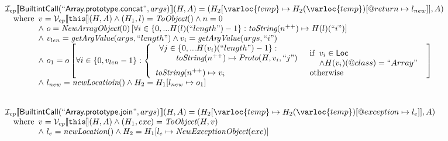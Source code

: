 \[\begin{array}{l}
\I _{cp}\lbr \SF{BuiltintCall}(``\SF{Array.prototype.concat}",args)\rbr(H,A)
 = (H_2[\varloc{temp}\mapsto H_2(\varloc{temp})[\varprop{return}\mapsto l_{new}]], A) \\
\quad\wherec{
  v = \V _{cp}\lbr \TT{this}\rbr (H,A) \land (H_1,l) = \hf{ToObject}()
  \land n = 0\\
  \land\ o = \hf{NewArrayObject}(0)\left[
        \forall i \in \{0,... H(l)(``length") -1\}:\hf{toString}(n^{++}) \mapsto H(l)(``i")\right]\\
  \land\ v_{len} = \hf{getArgValue}(args, ``length") \land v_i = \hf{getArgValue}(args, ``i")\\
  \land\ o_1 = o\left[\forall i \in \{0, v_{len} - 1\}:
    \left\{\begin{array}{ll}
      \begin{array}{l}
        \forall j \in \{0,... H(v_i)(``length") -1\}:\\
        \quad\quad\hf{toString}(n^{++}) \mapsto \hf{Proto}(H,v_i,``j")
      \end{array}
      & \ifc{v_i \in \SF{Loc}\\ \land H(v_i)(@class) = ``Array"}\\
      \hf{toString}(n^{++}) \mapsto v_i & \owc
    \end{array}\right.
  \right]\\
  \land\ l_{new} = \hf{newLocatioin}() \land H_2 = H_1[l_{new} \mapsto o_1]
  }\\
\\\\



\I _{cp}\lbr \SF{BuiltintCall}(``\SF{Array.prototype.join}",args)\rbr(H,A)
 = (H_2[\varloc{temp}\mapsto H_2(\varloc{temp})[\varprop{exception}\mapsto l_e]], A) \\
\quad\wherec{
  v = \V _{cp}\lbr \TT{this}\rbr (H,A) \land (H_1,exc) = \hf{ToObject}(H,v)\\
  \land\ l_e = \hf{newLocation}() \land H_2=H_1[l_e\mapsto\hf{NewExceptionObject}(exc)] 
  }\\
  

\end{array}\]
